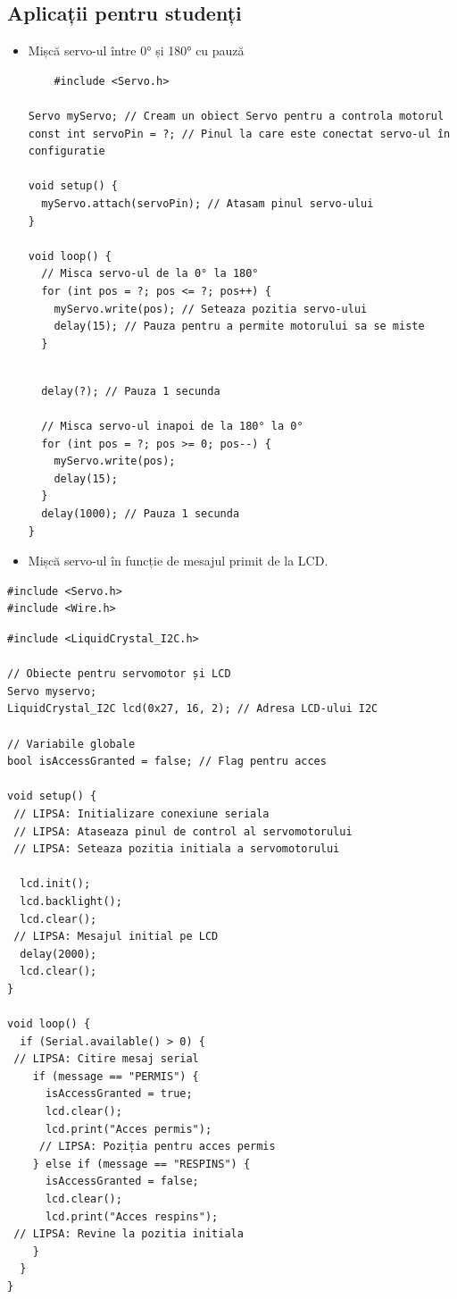 \documentclass{report}
\begin{document}
\subsection*{Aplicații pentru studenți}
\begin{itemize}
    \item  Mișcă servo-ul între 0° și 180° cu pauză
\begin{lstlisting}
    #include <Servo.h>

Servo myServo; // Cream un obiect Servo pentru a controla motorul
const int servoPin = ?; // Pinul la care este conectat servo-ul în configuratie

void setup() {
  myServo.attach(servoPin); // Atasam pinul servo-ului
}

void loop() {
  // Misca servo-ul de la 0° la 180°
  for (int pos = ?; pos <= ?; pos++) {
    myServo.write(pos); // Seteaza pozitia servo-ului
    delay(15); // Pauza pentru a permite motorului sa se miste
  }
    \end{lstlisting}
    \vspace*{1cm}
\begin{lstlisting}
  
  delay(?); // Pauza 1 secunda
  
  // Misca servo-ul inapoi de la 180° la 0°
  for (int pos = ?; pos >= 0; pos--) {
    myServo.write(pos);
    delay(15);
  }  
  delay(1000); // Pauza 1 secunda
}

\end{lstlisting}
    \item Mișcă servo-ul în funcție de mesajul primit de la LCD.
\end{itemize}
\begin{lstlisting}
#include <Servo.h>
#include <Wire.h>
\end{lstlisting}
\vspace*{1cm}
\begin{lstlisting}
#include <LiquidCrystal_I2C.h>

// Obiecte pentru servomotor și LCD
Servo myservo;
LiquidCrystal_I2C lcd(0x27, 16, 2); // Adresa LCD-ului I2C

// Variabile globale
bool isAccessGranted = false; // Flag pentru acces

void setup() {
 // LIPSA: Initializare conexiune seriala
 // LIPSA: Ataseaza pinul de control al servomotorului
 // LIPSA: Seteaza pozitia initiala a servomotorului

  lcd.init();
  lcd.backlight();
  lcd.clear();
 // LIPSA: Mesajul initial pe LCD
  delay(2000);
  lcd.clear();
}

void loop() {
  if (Serial.available() > 0) {
 // LIPSA: Citire mesaj serial
    if (message == "PERMIS") {
      isAccessGranted = true;
      lcd.clear();
      lcd.print("Acces permis");
     // LIPSA: Poziția pentru acces permis
    } else if (message == "RESPINS") {
      isAccessGranted = false;
      lcd.clear();
      lcd.print("Acces respins");
 // LIPSA: Revine la pozitia initiala
    }
  }
}


\end{lstlisting}
\end{document}
